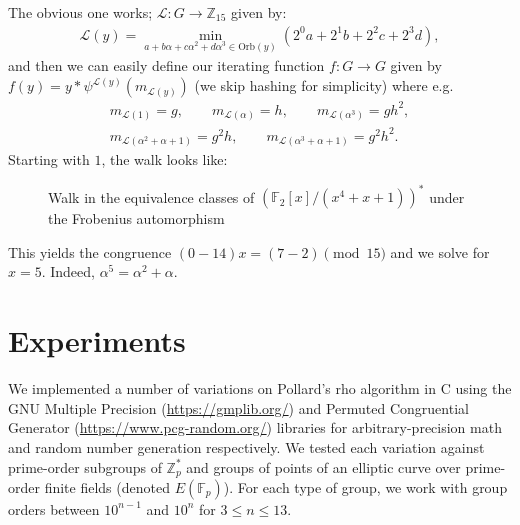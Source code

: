 \documentclass{article}
\newcommand{\ZZ}{\mathbb{Z}}
\newcommand{\FF}{\mathbb{F}}
\newcommand{\Orb}{\mathrm{Orb}}
\begin{document}
The obvious one works; $\mathcal{L} : G \to \ZZ_{15}$ given by:
\begin{align*}
	\mathcal{L}(y) = \min_{a+b\alpha+c\alpha^2+d\alpha^3 \in \Orb(y)} (2^0a+2^1b+2^2c+2^3d),
\end{align*}
and then we can easily define our iterating function $f: G \to G$ given by $f(y) = y*\psi^{\mathcal{L}(y)}(m_{\mathcal{L}(y)})$ (we skip hashing for simplicity) where e.g.
\begin{align*}
	m_{\mathcal{L}(1)}=g, \qquad
	m_{\mathcal{L}(\alpha)} =h, \qquad
	m_{\mathcal{L}(\alpha^3)}=gh^2, \\
	m_{\mathcal{L}(\alpha^2+\alpha+1)}=g^2h, \qquad
	m_{\mathcal{L}(\alpha^3+\alpha+1)}=g^2h^2.
\end{align*}
Starting with $1$, the walk looks like:
\begin{figure}[H]
	\centering
	\caption{Walk in the equivalence classes of $(\FF_2[x]/(x^4+x+1))^*$ under the Frobenius automorphism}
\end{figure}
This yields the congruence $(0-14)x=(7-2) \pmod {15}$ and we solve for $x=5$. Indeed, $\alpha^5 = \alpha^2+\alpha$.
\fi

\section{Experiments}

We implemented a number of variations on Pollard's rho algorithm in C using the GNU Multiple Precision (\href{https://gmplib.org/}{https://gmplib.org/}) and Permuted Congruential Generator (\href{https://www.pcg-random.org/}{https://www.pcg-random.org/}) libraries for arbitrary-precision math and random number generation respectively. We tested each variation against prime-order subgroups of $\ZZ_p^*$ and groups of points of an elliptic curve over prime-order finite fields (denoted $E(\FF_p)$). For each type of group, we work with group orders between $10^{n-1}$ and $10^n$ for $3 \leq n \leq 13$. 
\end{document}
